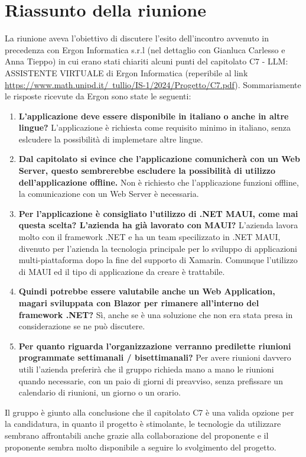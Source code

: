 \section{Riassunto della riunione}

    La riunione aveva l'obiettivo di discutere l'esito dell'incontro avvenuto in precedenza con Ergon Informatica s.r.l (nel dettaglio con Gianluca Carlesso e Anna Tieppo) in cui erano stati chiariti alcuni punti del capitolato C7 - LLM: ASSISTENTE VIRTUALE di Ergon Informatica (reperibile al link \href{https://www.math.unipd.it/~tullio/IS-1/2024/Progetto/C7.pdf}{https://www.math.unipd.it/~tullio/IS-1/2024/Progetto/C7.pdf}). 
    Sommariamente le risposte ricevute da Ergon sono state le seguenti:
\begin{enumerate}
    \item \textbf{L'applicazione deve essere disponibile in italiano o anche in altre lingue?} L'applicazione è richiesta come requisito minimo in italiano, senza eslcudere la possibilità di implemetare altre lingue.
    \item \textbf{Dal capitolato si evince che l'applicazione comunicherà con un Web Server, questo sembrerebbe escludere la possibilità di utilizzo dell'applicazione offline.} Non è richiesto che l'applicazione funzioni offline, la comunicazione con un Web Server è necessaria.
     \item \textbf{Per l'applicazione è consigliato l'utilizzo di .NET MAUI, come mai questa scelta? L'azienda ha già lavorato con MAUI?} L'azienda lavora molto con il framework .NET e ha un team specilizzato in .NET MAUI, divenuto per l'azienda la tecnologia principale per lo sviluppo di applicazioni multi-piattaforma dopo la fine del supporto di Xamarin. Comunque l'utilizzo di MAUI ed il tipo di applicazione da creare è trattabile. 
    \item \textbf{Quindi potrebbe essere valutabile anche un Web Application, magari sviluppata con Blazor per rimanere all'interno del framework .NET?} Sì, anche se è una soluzione che non era stata presa in considerazione se ne può discutere.
    \item \textbf{Per quanto riguarda l'organizzazione verranno predilette riunioni programmate settimanali / bisettimanali?} Per avere riunioni davvero utili l'azienda preferirà che il gruppo richieda mano a mano le riunioni quando necessarie, con un paio di giorni di preavviso, senza prefissare un calendario di riunioni, un giorno o un orario.

\end{enumerate}

Il gruppo è giunto alla conclusione che il capitolato C7 è una valida opzione per la candidatura, in quanto il progetto è stimolante, le tecnologie da utilizzare sembrano affrontabili anche grazie alla collaborazione del proponente e il proponente sembra molto disponibile a seguire lo svolgimento del progetto.



